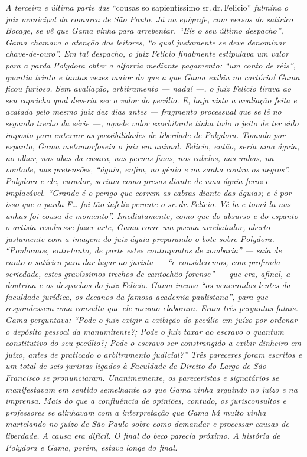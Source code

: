 \begin{didascalia}
\emph{A terceira e última parte das} ``cousas so sapientíssimo sr.\,dr.\,Felicio'' \emph{fulmina o juiz municipal da comarca de São Paulo. Já na
epígrafe, com versos do satírico Bocage, se vê que Gama vinha para
arrebentar. ``Eis o seu último despacho'', Gama chamava a atenção dos
leitores, ``o qual justamente se deve denominar chave-de-ouro''. Em tal
despacho, o juiz Felicio finalmente estipulava um valor para a parda
Polydora obter a alforria mediante pagamento: ``um conto de réis'',
quantia trinta e tantas vezes maior do que a que Gama exibiu no
cartório! Gama ficou furioso. Sem avaliação, arbitramento --- nada! ---, o
juiz Felicio tirava ao seu capricho qual deveria ser o valor do pecúlio.
E, haja vista a avaliação feita e acatada pelo mesmo juiz dez dias antes
--- fragmento processual que se lê no segundo trecho da série ---, aquele
valor exorbitante tinha todo o jeito de ter sido imposto para enterrar
as possibilidades de liberdade de Polydora. Tomado por espanto, Gama
metamorfoseia o juiz em animal. Felicio, então, seria uma águia, no
olhar, nas abas da casaca, nas pernas finas, nos cabelos, nas unhas, na
vontade, nas pretensões, ``águia, enfim, no gênio e na sanha contra os
negros''. Polydora e ele, curador, seriam como presas diante de uma águia
feroz e implacável. ``Grande é o perigo que correm as cabras diante das
águias; e é por isso que a parda F\ldots{} foi tão infeliz perante o sr.\,dr.\,Felicio. Vê-la e tomá-la nas unhas foi cousa de momento''. Imediatamente,
como que do absurso e do espanto o artista resolvesse fazer arte, Gama
corre um poema arrebatador, aberto justamente com a imagem do juiz-águia
preparando o bote sobre Polydora. ``Ponhamos, entretanto, de parte estes
contrapontos de zombaria'' --- saía de canto o satírico para dar lugar ao
jurista --- ``e consideremos, com profunda seriedade, estes gravíssimos
trechos de cantochão forense'' --- que era, afinal, a doutrina e os
despachos do juiz Felicio. Gama incova ``os venerandos lentes da
faculdade jurídica, os decanos da famosa academia paulistana'', para que
respondessem uma consulta que ele mesmo elaborara. Eram três perguntas
fatais. Gama perguntava: ``Pode o juiz exigir a exibição do pecúlio em
juízo por ordenar o depósito pessoal da manumitente?; Pode o juiz taxar
ao escravo o quantum constitutivo do seu pecúlio?; Pode o escravo ser
constrangido a exibir dinheiro em juízo, antes de praticado o
arbitramento judicial?'' Três pareceres foram escritos e um total de seis
juristas ligados à Faculdade de Direito do Largo de São Francisco se
pronunciaram. Unanimemente, os pareceristas e signatários se
manifestavam em sentido semelhante ao que Gama vinha arguindo no juízo e
na imprensa. Mais do que a confluência de opiniões, contudo, os
jurisconsultos e professores se alinhavam com a interpretação que Gama
há muito vinha martelando no juízo de São Paulo sobre como demandar e
processar causas de liberdade. A causa era difícil. O final do beco
parecia próximo. A história de Polydora e Gama, porém, estava longe do
final.}
\end{didascalia}

